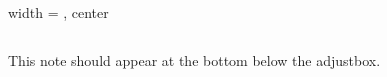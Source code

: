 \begin{table}[htbp]
\begin{adjustbox}{width = \textwidth, center}
\begin{tabular}{lccc}
         \bottomrule
         
      \end{tabular}
      
      
      
   \end{adjustbox}
      \par \raggedright 
   This note should appear at the bottom below the adjustbox.
   
\end{table}


